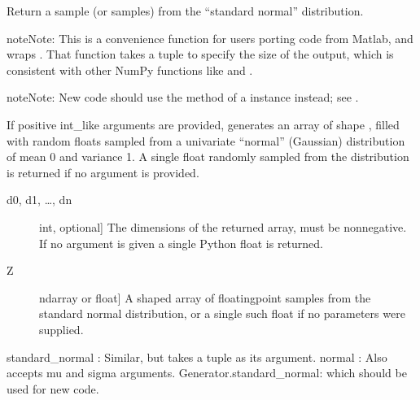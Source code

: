 \documentclass[letterpaper,10pt,english]{sphinxmanual}
\begin{document}
\begin{fulllineitems}
\label{\detokenize{infrapy.utils:infrapy.utils.ref2sac.randn}}
Return a sample (or samples) from the “standard normal” distribution.

\begin{sphinxadmonition}{note}{Note:}
This is a convenience function for users porting code from Matlab,
and wraps . That function takes a
tuple to specify the size of the output, which is consistent with
other NumPy functions like  and .
\end{sphinxadmonition}

\begin{sphinxadmonition}{note}{Note:}
New code should use the  method of a 
instance instead; see .
\end{sphinxadmonition}

If positive int\_like arguments are provided,  generates an array
of shape , filled
with random floats sampled from a univariate “normal” (Gaussian)
distribution of mean 0 and variance 1. A single float randomly sampled
from the distribution is returned if no argument is provided.
\begin{description}
\item[{d0, d1, …, dn}] \leavevmode{[}int, optional{]}
The dimensions of the returned array, must be non\sphinxhyphen{}negative.
If no argument is given a single Python float is returned.

\end{description}
\begin{description}
\item[{Z}] \leavevmode{[}ndarray or float{]}
A \sphinxhyphen{}shaped array of floating\sphinxhyphen{}point samples from
the standard normal distribution, or a single such float if
no parameters were supplied.

\end{description}

standard\_normal : Similar, but takes a tuple as its argument.
normal : Also accepts mu and sigma arguments.
Generator.standard\_normal: which should be used for new code.


\end{fulllineitems}
\end{document}
